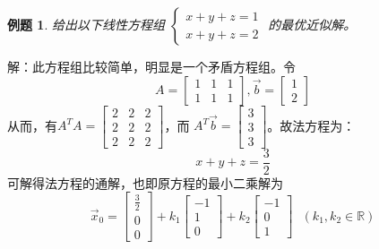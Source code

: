 \documentclass[a4paper]{book}
\newtheorem{eg}{例题}[chapter]
\begin{document}
\begin{eg}
 给出以下线性方程组
$\begin{cases}
x+y+z=1\\x+y+z=2
\end{cases}$
的最优近似解。
\end{eg}
解：此方程组比较简单，明显是一个矛盾方程组。令
\begin{equation*}
A=\begin{bmatrix}1&1&1\\1&1&1\end{bmatrix},
\vec{b}=\begin{bmatrix}1\\2\end{bmatrix}
\end{equation*}
从而，有$A^TA=\begin{bmatrix}2&2&2\\2&2&2\\2&2&2\end{bmatrix}$，而
$A^T\vec{b}=\begin{bmatrix}3\\3\\3\end{bmatrix}$。故法方程为：
$$x+y+z=\frac{3}{2}$$
可解得法方程的通解，也即原方程的最小二乘解为
\begin{equation*}
\vec{x}_0=\begin{bmatrix}\frac{3}{2}\\0\\0\end{bmatrix}+
k_1\begin{bmatrix}-1\\1\\0\end{bmatrix}+k_2\begin{bmatrix}-1\\0\\1\end{bmatrix}
~~~(k_1,k_2\in\mathbb{R})
\end{equation*}
\end{document}
